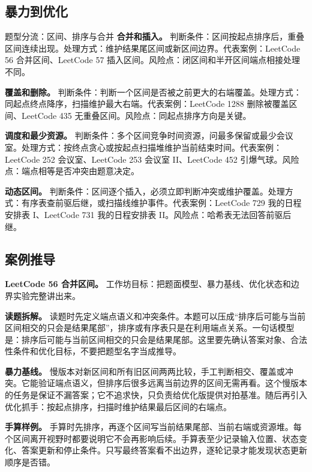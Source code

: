 \subsection{暴力到优化}

\begin{principlebox}{题型分流：区间、排序与合并}
\textbf{合并和插入。}
判断条件：区间按起点排序后，重叠区间连续出现。处理方式：维护结果尾区间或新区间边界。代表案例：LeetCode 56 合并区间、LeetCode 57 插入区间。风险点：闭区间和半开区间端点相接处理不同。

\textbf{覆盖和删除。}
判断条件：判断一个区间是否被之前更大的右端覆盖。处理方式：同起点终点降序，扫描维护最大右端。代表案例：LeetCode 1288 删除被覆盖区间、LeetCode 435 无重叠区间。风险点：同起点排序方向是关键。

\textbf{调度和最少资源。}
判断条件：多个区间竞争时间资源，问最多保留或最少会议室。处理方式：按终点贪心或按起点扫描堆维护当前结束时间。代表案例：LeetCode 252 会议室、LeetCode 253 会议室 II、LeetCode 452 引爆气球。风险点：端点相等是否冲突由题意决定。

\textbf{动态区间。}
判断条件：区间逐个插入，必须立即判断冲突或维护覆盖。处理方式：有序表查前驱后继，或扫描线维护事件。代表案例：LeetCode 729 我的日程安排表 I、LeetCode 731 我的日程安排表 II。风险点：哈希表无法回答前驱后继。

\end{principlebox}

\subsection{案例推导}

\noindent\textbf{LeetCode 56 合并区间。} 工作坊目标：把题面模型、暴力基线、优化状态和边界实验完整讲出来。

\textbf{读题拆解。} 读题时先定义端点语义和冲突条件。本题可以压成“排序后可能与当前区间相交的只会是结果尾部”，排序或有序表只是在利用端点关系。一句话模型是：排序后可能与当前区间相交的只会是结果尾部。这里要先确认答案对象、合法性条件和优化目标，不要把题型名字当成推导。

\textbf{暴力基线。} 慢版本对新区间和所有旧区间两两比较，手工判断相交、覆盖或冲突。它能验证端点语义，但排序后很多远离当前边界的区间无需再看。这个慢版本的任务是保证不漏答案；它不追求快，只负责给优化版提供对拍基准。随后再引入优化抓手：按起点排序，扫描时维护结果最后区间的右端点。

\textbf{手算样例。} 手算时先排序，再逐个区间写当前结果尾部、当前右端或资源堆。每个区间离开视野时都要说明它不会再影响后续。手算表至少记录输入位置、状态变化、答案更新和停止条件。只写最终答案看不出边界，逐轮记录才能发现状态更新顺序是否错。

